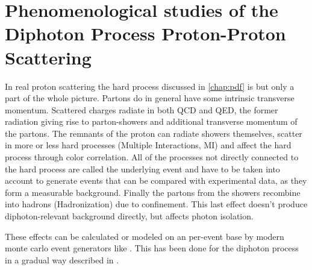 \chapter{Phenomenological studies of the Diphoton Process Proton-Proton
  Scattering}%
\label{chap:pheno}

In real proton scattering the hard process discussed in
\cref{chap:pdf} is but only a part of the whole picture. Partons do in
general have some intrinsic transverse momentum.  Scattered charges
radiate in both QCD and QED, the former radiation giving rise to
parton-showers and additional transverse momentum of the partons. The
remnants of the proton can radiate showers themselves, scatter in more
or less hard processes (Multiple Interactions, MI) and affect the hard
process through color correlation. All of the processes not directly
connected to the hard process are called the underlying event and have
to be taken into account to generate events that can be compared with
experimental data, as they form a measurable background. Finally the
partons from the showers recombine into hadrons (Hadronization) due to
confinement. This last effect doesn't produce diphoton-relevant
background directly, but affects photon
isolation.~\cite[11]{buckley:2011ge} %

These effects can be calculated or modeled on an per-event base by
modern monte carlo event generators like \sherpa. This has been done
for the diphoton process in a gradual way described in .


